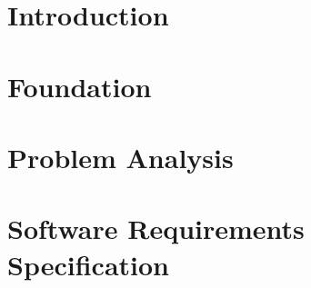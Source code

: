 \documentclass[12pt]{report}
\begin{document}
\tableofcontents

\chapter{Introduction}





\chapter{\centeringTheoretical Foundation}\label{chap:2}






\chapter{Problem Analysis}\label{chap:3}





\chapter{Software Requirements Specification}



% 
% 




\printbibliography
\end{document}
